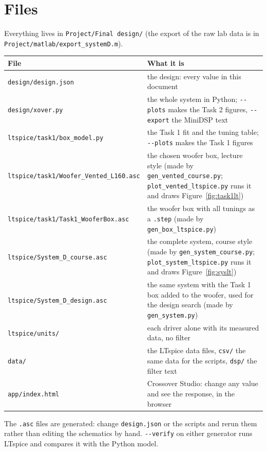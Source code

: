 \documentclass[a4paper,10pt]{article}
\newcommand{\file}[1]{\nolinkurl{#1}}
\newcommand{\cmd}[1]{\texttt{#1}}   %
\begin{document}
\section{Files}
Everything lives in \cmd{Project/Final design/} (the export of the raw lab data is in
\file{Project/matlab/export_systemD.m}).
\begin{center}
\begin{tabularx}{\linewidth}{lX}
\toprule
File & What it is \\
\midrule
\file{design/design.json} & the design: every value in this document \\
\file{design/xover.py} & the whole system in Python; \file{--plots} makes the Task 2 figures, \file{--export} the MiniDSP text \\
\file{ltspice/task1/box_model.py} & the Task 1 fit and the tuning table; \file{--plots} makes the Task 1 figures \\
\file{ltspice/task1/Woofer_Vented_L160.asc} & the chosen woofer box, lecture style (made by \file{gen_vented_course.py}; \file{plot_vented_ltspice.py} runs it and draws Figure~\ref{fig:task1lt}) \\
\file{ltspice/task1/Task1_WooferBox.asc} & the woofer box with all tunings as a \file{.step} (made by \file{gen_box_ltspice.py}) \\
\file{ltspice/System_D_course.asc} & the complete system, course style (made by \file{gen_system_course.py}; \file{plot_system_ltspice.py} runs it and draws Figure~\ref{fig:syslt}) \\
\file{ltspice/System_D_design.asc} & the same system with the Task 1 box added to the woofer, used for the design search (made by \file{gen_system.py}) \\
\file{ltspice/units/} & each driver alone with its measured data, no filter \\
\file{data/} & the LTspice data files, \file{csv/} the same data for the scripts, \file{dsp/} the filter text \\
\file{app/index.html} & Crossover Studio: change any value and see the response, in the browser \\
\bottomrule
\end{tabularx}
\end{center}
The \file{.asc} files are generated: change \file{design.json} or the scripts and rerun them rather
than editing the schematics by hand. \file{--verify} on either generator runs LTspice and compares it
with the Python model.
\end{document}
